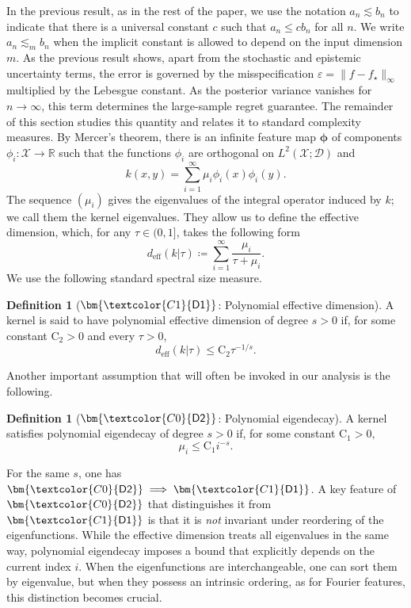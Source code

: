 \documentclass{article}
\numberwithin{theorem}{section}
\theoremstyle{definition}
\newtheorem{definition}[theorem]{Definition}
\newcommand{\fwithin}{f_\star}
\newcommand{\inpdist}{\Ds}
\newcommand{\Ds}{\mathcal D}
\newcommand{\Xs}{\mathcal X}
\newcommand{\defpoly}{\bm{\textcolor{C0}{\mathsf{D2}}}}
\newcommand{\defeff}{\bm{\textcolor{C1}{\mathsf{D1}}}}
\begin{document}
In the previous result, as in the rest of the paper, we use the notation $a_n\lesssim b_n$ to indicate that there is a universal constant $c$ such that $a_n\le c b_n$ for all $n$. We write $a_n\lesssim_m b_n$ when the implicit constant is allowed to depend on the input dimension $m$.
As the previous result shows, apart from the stochastic and epistemic uncertainty terms, the error is governed by the misspecification $\varepsilon=\|f-\fwithin\|_\infty$ multiplied by the Lebesgue constant. As the posterior variance vanishes for $n\to \infty$, this term determines the large-sample regret guarantee. The remainder of this section studies this quantity and relates it to standard complexity measures.
By Mercer's theorem, there is an infinite feature map $\bm \phi$ of components $\phi_i:\Xs\to \mathbb R$ such that the functions $\phi_i$ are orthogonal on $L^2(\Xs;\inpdist)$ and
\begin{equation}
    k(x,y)=\sum_{i=1}^\infty \mu_i \phi_i(x)\phi_i(y)\label{eq:mercer}.
\end{equation}
The sequence $(\mu_i)$ gives the eigenvalues of the integral operator induced by $k$; we call them the kernel eigenvalues. They allow us to define the effective dimension, which, for any $\tau\in (0,1]$, takes the following form
\begin{equation}
    d_\text{eff}(k|\tau)\coloneqq \sum_{i=1}^\infty\frac{\mu_i}{\tau + \mu_i}\label{eq:deff}.
\end{equation}
We use the following standard spectral size measure.
\begin{definition}
    [$\defeff$: Polynomial effective dimension] A kernel is said to have polynomial effective dimension of degree $s>0$ if, for some constant $\text{C}_2>0$ and every $\tau>0$,
    $$d_\text{eff}(k|\tau)\le \text{C}_2 \tau^{-1/s}.$$
\end{definition}
Another important assumption that will often be invoked in our analysis is the following.
\begin{definition}
    [$\defpoly$: Polynomial eigendecay] A kernel satisfies polynomial eigendecay of degree $s>0$ if, for some constant $\text{C}_1>0,$
    $$\mu_i\le \text{C}_1 i^{-s}.$$
\end{definition}
For the same $s$, one has $\defpoly \implies \defeff$. A key feature of $\defpoly$ that distinguishes it from $\defeff$ is that it is \textit{not} invariant under reordering of the eigenfunctions. While the effective dimension treats all eigenvalues in the same way, polynomial eigendecay imposes a bound that explicitly depends on the current index $i$. When the eigenfunctions are interchangeable, one can sort them by eigenvalue, but when they possess an intrinsic ordering, as for Fourier features, this distinction becomes crucial.
\end{document}
